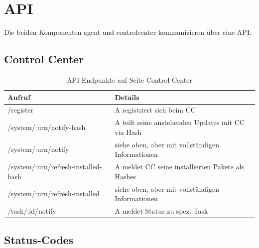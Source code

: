 \section{API}

Die beiden Komponenten \gls{agent} und \gls{controlcenter} kommunizieren über eine API.

\subsection{Control Center}

\begin{table}[H]
\centering
\caption{API-Endpunkte auf Seite Control Center}
\label{api:endpoints}
\begin{tabular}{ll}
\hline
\textbf{Aufruf}                     & \textbf{Details}                                  \\ \hline
/register                           & A registriert sich beim CC                        \\
/system/:urn/notify-hash            & A teilt seine anstehenden Updates mit CC via Hash \\
/system/:urn/notify                 & siehe oben, aber mit vollständigen Informationen  \\
/system/:urn/refresh-installed-hash & A meldet CC seine installierten Pakete als Hashes \\
/system/:urn/refresh-installed      & siehe oben, aber mit vollständigen Informationen  \\
/task/:id/notify                    & A meldet Status zu spez. Task                     \\ \hline
\end{tabular}
\end{table}

\subsection{Status-Codes}

